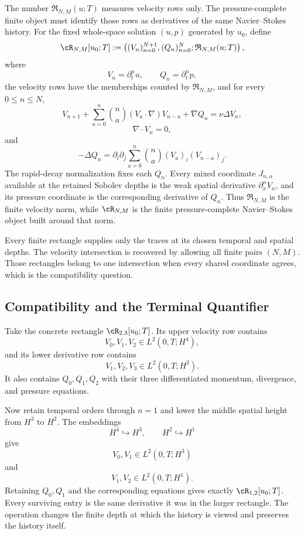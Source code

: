 The number \(\mathfrak R_{N,M}(u;T)\) measures velocity rows only.
The pressure-complete finite object must identify those rows as derivatives of the same Navier--Stokes history.
For the fixed whole-space solution \((u,p)\) generated by \(u_0\), define
\[
  \cR_{N,M}[u_0;T]
  :=
  \left(
    (V_n)_{n=0}^{N+1},
    (Q_n)_{n=0}^{N};
    \mathfrak R_{N,M}(u;T)
  \right),
\]
where
\[
  V_n=\partial_t^nu,
  \qquad
  Q_n=\partial_t^np,
\]
the velocity rows have the memberships counted by \(\mathfrak R_{N,M}\), and for every \(0\leq n\leq N\),
\[
  V_{n+1}
  +
  \sum_{a=0}^{n}
  \binom{n}{a}
  (V_a\cdot\nabla)V_{n-a}
  +\nabla Q_n
  =
  \nu\Delta V_n,
\]
\[
  \nabla\cdot V_n=0,
\]
and
\[
  -\Delta Q_n
  =
  \partial_i\partial_j
  \sum_{a=0}^{n}
  \binom{n}{a}
  (V_a)_i(V_{n-a})_j.
\]
The rapid-decay normalization fixes each \(Q_n\).
Every mixed coordinate \(J_{n,\alpha}\) available at the retained Sobolev depths is the weak spatial derivative \(\partial_x^\alpha V_n\), and its pressure coordinate is the corresponding derivative of \(Q_n\).
Thus \(\mathfrak R_{N,M}\) is the finite velocity norm, while \(\cR_{N,M}\) is the finite pressure-complete Navier--Stokes object built around that norm.

Every finite rectangle supplies only the traces at its chosen temporal and spatial depths.
The velocity intersection is recovered by allowing all finite pairs \((N,M)\).
Those rectangles belong to one intersection when every shared coordinate agrees, which is the compatibility question.


\subsection{Compatibility and the Terminal Quantifier}\label{sub:CompatibilityAndTheTerminalQuantifier}

Take the concrete rectangle \(\cR_{2,3}[u_0;T]\).
Its upper velocity row contains
\[
  V_0,V_1,V_2
  \in
  L^2(0,T;H^4),
\]
and its lower derivative row contains
\[
  V_1,V_2,V_3
  \in
  L^2(0,T;H^2).
\]
It also contains \(Q_0,Q_1,Q_2\) with their three differentiated momentum, divergence, and pressure equations.

Now retain temporal orders through \(n=1\) and lower the middle spatial height from \(H^3\) to \(H^2\).
The embeddings
\[
  H^4\hookrightarrow H^3,
  \qquad
  H^2\hookrightarrow H^1
\]
give
\[
  V_0,V_1
  \in
  L^2(0,T;H^3)
\]
and
\[
  V_1,V_2
  \in
  L^2(0,T;H^1).
\]
Retaining \(Q_0,Q_1\) and the corresponding equations gives exactly \(\cR_{1,2}[u_0;T]\).
Every surviving entry is the same derivative it was in the larger rectangle.
The operation changes the finite depth at which the history is viewed and preserves the history itself.

